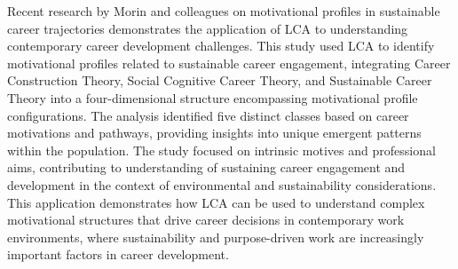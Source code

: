 \documentclass[main.tex]{subfiles}
\begin{document}
Recent research by Morin and colleagues on motivational profiles in sustainable career trajectories demonstrates the application of LCA to understanding contemporary career development challenges\parencite{sustainability2025}. This study used LCA to identify motivational profiles related to sustainable career engagement, integrating Career Construction Theory, Social Cognitive Career Theory, and Sustainable Career Theory into a four-dimensional structure encompassing motivational profile configurations. The analysis identified five distinct classes based on career motivations and pathways, providing insights into unique emergent patterns within the population. The study focused on intrinsic motives and professional aims, contributing to understanding of sustaining career engagement and development in the context of environmental and sustainability considerations. This application demonstrates how LCA can be used to understand complex motivational structures that drive career decisions in contemporary work environments, where sustainability and purpose-driven work are increasingly important factors in career development.
\end{document}
